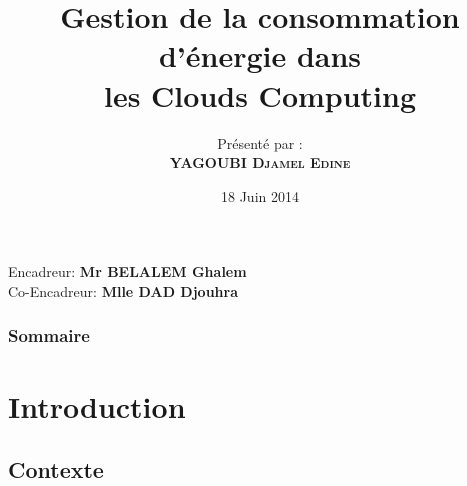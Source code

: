 \documentclass[xcolor=dvipsnames]{beamer}
\title[Cloud Computing]{Gestion de la consommation d’énergie dans\\ les Clouds Computing}
\author{Pr\'esent\'e par :\\ \textbf{\textsc{YAGOUBI Djamel Edine}} }
\date{{ 18 Juin 2014}}
\begin{document}
\begin{frame}
\begin{center}
\end{center}
\titlepage
{\scriptsize Encadreur:\textbf{ Mr BELALEM Ghalem}
                         \\ Co-Encadreur:\textbf{ Mlle DAD Djouhra }}                         
\end{frame}



\begin{frame}
\frametitle{Sommaire}
\tableofcontents[hideothersubsections]
\end{frame}




\section{Introduction}
\subsection{Contexte}
\end{document}
